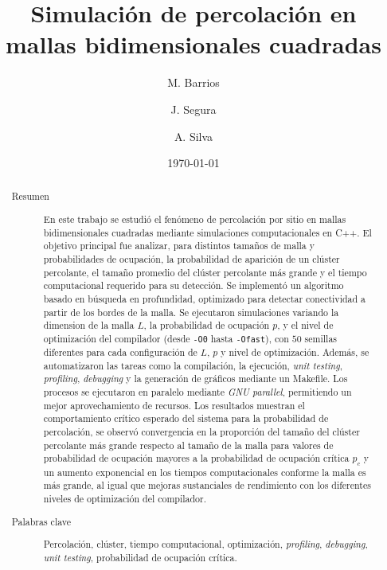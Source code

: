 \documentclass[%
 reprint,
 amsmath,amssymb,
 aps,
]{revtex4-2}
\begin{document}

\title{Simulación de percolación en mallas bidimensionales cuadradas}%

 
\author{M. Barrios}
\author{J. Segura}
\author{A. Silva}
%
\date{\today}%
\begin{abstract}
\begin{description}
\item[Resumen] En este trabajo se estudió el fenómeno de percolación por sitio en mallas bidimensionales cuadradas mediante simulaciones computacionales en C++. El objetivo principal fue analizar, para distintos tamaños de malla y probabilidades de ocupación, la probabilidad de aparición de un clúster percolante, el tamaño promedio del clúster percolante más grande y el tiempo computacional requerido para su detección. Se implementó un algoritmo basado en búsqueda en profundidad, optimizado para detectar conectividad a partir de los bordes de la malla. Se ejecutaron simulaciones variando la dimension de la malla $L$, la probabilidad de ocupación $p$, y el nivel de optimización del compilador (desde \texttt{-O0} hasta \texttt{-Ofast}), con $50$ semillas diferentes para cada configuración de $L$, $p$ y nivel de optimización. Además, se automatizaron las tareas como la compilación, la ejecución, \textit{unit testing}, \textit{profiling}, \textit{debugging} y la generación de gráficos mediante un Makefile. Los procesos se ejecutaron en paralelo mediante \textit{GNU parallel}, permitiendo un mejor aprovechamiento de recursos. Los resultados muestran el comportamiento crítico esperado del sistema para la probabilidad de percolación, se observó convergencia en la proporción del tamaño del clúster percolante más grande respecto al tamaño de la malla para valores de probabilidad de ocupación mayores a la probabilidad de ocupación crítica $p_c$ y un aumento exponencial en los tiempos computacionales conforme la malla es más grande, al igual que mejoras sustanciales de rendimiento con los diferentes niveles de optimización del compilador.


\end{description}
\begin{description}
\item[Palabras clave] Percolación, clúster, tiempo computacional, optimización, \textit{profiling}, \textit{debugging}, \textit{unit testing}, probabilidad de ocupación crítica.

\end{description}
\end{abstract}
\end{document}
